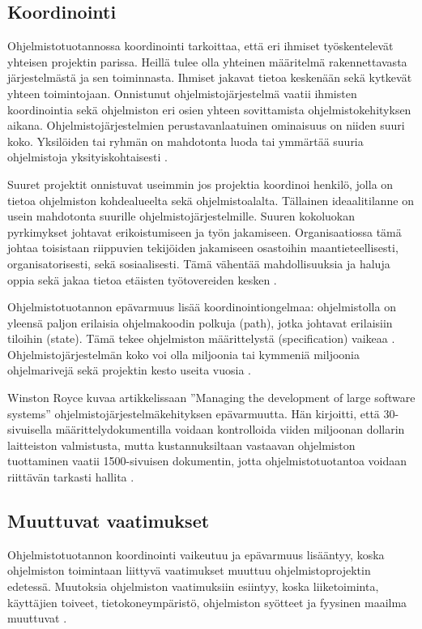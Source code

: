 \documentclass[finnish]{tktltiki2}
\theoremstyle{definition}
\theoremstyle{remark}
\begin{document}
\subsection{Koordinointi}

Ohjelmistotuotannossa koordinointi tarkoittaa, että eri ihmiset työskentelevät yhteisen projektin parissa. Heillä tulee olla yhteinen määritelmä rakennettavasta järjestelmästä ja sen toiminnasta. Ihmiset jakavat tietoa keskenään sekä kytkevät yhteen toimintojaan. Onnistunut ohjelmistojärjestelmä vaatii ihmisten koordinointia sekä ohjelmiston eri osien yhteen sovittamista ohjelmistokehityksen aikana. Ohjelmistojärjestelmien perustavanlaatuinen ominaisuus on niiden suuri koko. Yksilöiden tai ryhmän on mahdotonta luoda tai ymmärtää suuria ohjelmistoja yksityiskohtaisesti \cite{KES95}.

Suuret projektit onnistuvat useimmin jos projektia koordinoi henkilö, jolla on tietoa ohjelmiston kohdealueelta sekä ohjelmistoalalta. Tällainen ideaalitilanne on usein mahdotonta suurille ohjelmistojärjestelmille. Suuren kokoluokan pyrkimykset johtavat erikoistumiseen ja työn jakamiseen. Organisaatiossa tämä johtaa toisistaan riippuvien tekijöiden jakamiseen osastoihin maantieteellisesti, organisatorisesti, sekä sosiaalisesti. Tämä vähentää mahdollisuuksia ja haluja oppia sekä jakaa tietoa etäisten työtovereiden kesken \cite{KES95}.

Ohjelmistotuotannon epävarmuus lisää koordinointiongelmaa: ohjelmistolla on yleensä paljon erilaisia ohjelmakoodin polkuja (path), jotka johtavat erilaisiin tiloihin (state). Tämä tekee ohjelmiston määrittelystä (specification) vaikeaa \cite{BOE06}. Ohjelmistojärjestelmän koko voi olla miljoonia tai kymmeniä miljoonia ohjelmarivejä sekä projektin kesto useita vuosia \cite{KES95}. 

Winston Royce kuvaa artikkelissaan ''Managing the development of large software systems'' ohjelmistojärjestelmäkehityksen epävarmuutta. Hän kirjoitti, että 30-sivuisella määrittelydokumentilla voidaan kontrolloida viiden miljoonan dollarin laitteiston valmistusta, mutta kustannuksiltaan vastaavan ohjelmiston tuottaminen vaatii 1500-sivuisen dokumentin, jotta ohjelmistotuotantoa voidaan riittävän tarkasti hallita \cite{ROY70}.

\subsection{Muuttuvat vaatimukset}

Ohjelmistotuotannon koordinointi vaikeutuu ja epävarmuus lisääntyy, koska ohjelmiston toimintaan liittyvä vaatimukset muuttuu ohjelmistoprojektin edetessä. Muutoksia ohjelmiston vaatimuksiin esiintyy, koska liiketoiminta, käyttäjien toiveet, tietokoneympäristö, ohjelmiston syötteet ja fyysinen maailma muuttuvat \cite{KES95}.
\end{document}
